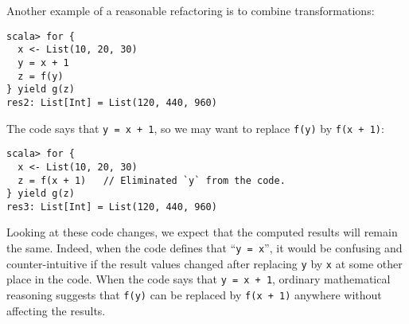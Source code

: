 Another example of a reasonable refactoring  is to combine transformations:
\begin{lstlisting}
scala> for {
  x <- List(10, 20, 30)
  y = x + 1
  z = f(y)
} yield g(z)
res2: List[Int] = List(120, 440, 960) 
\end{lstlisting}
The code says that \lstinline!y = x + 1!, so we may want to replace
\lstinline!f(y)! by \lstinline!f(x + 1)!:
\begin{lstlisting}
scala> for {
  x <- List(10, 20, 30)
  z = f(x + 1)   // Eliminated `y` from the code.
} yield g(z)
res3: List[Int] = List(120, 440, 960) 
\end{lstlisting}

Looking at these code changes, we expect that the computed results
will remain the same. Indeed, when the code defines that \textsf{``}\lstinline!y = x!\textsf{''},
it would be confusing and counter-intuitive if the result values changed
after replacing \lstinline!y! by \lstinline!x! at some other place
in the code. When the code says that \lstinline!y = x + 1!, ordinary
mathematical reasoning suggests that \lstinline!f(y)! can be replaced
by \lstinline!f(x + 1)! anywhere without affecting the results.


